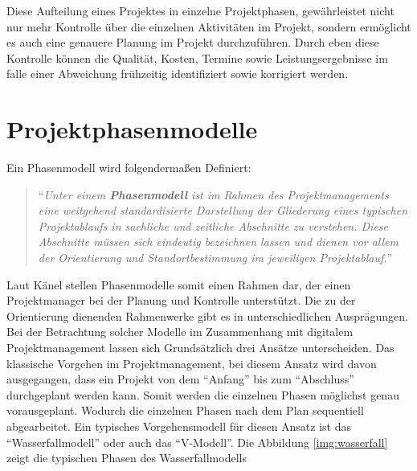 	Diese Aufteilung eines Projektes in einzelne Projektphasen, gewährleistet nicht nur mehr  Kontrolle über die einzelnen Aktivitäten im Projekt, sondern ermöglicht es auch eine genauere Planung im Projekt durchzuführen. Durch eben diese Kontrolle können die Qualität, Kosten, Termine sowie Leistungsergebnisse im falle einer Abweichung frühzeitig identifiziert sowie korrigiert werden.\cite[57]{Känel_2020_Projektphasen}
	
	
\section{Projektphasenmodelle}
\label{sec:phasenmodell}

	Ein Phasenmodell wird folgendermaßen Definiert:
	
	\begin{quote}
		\enquote{\textit{Unter einem \textbf{Phasenmodell} ist im Rahmen des Projektmanagements eine weitgehend
		standardisierte Darstellung der Gliederung eines typischen Projektablaufs
		in sachliche und zeitliche Abschnitte zu verstehen.
		Diese Abschnitte müssen sich eindeutig bezeichnen lassen und dienen vor allem
		der Orientierung und Standortbestimmung im jeweiligen Projektablauf.}}\autocite[57]{Känel_2020_Projektphasen}
	\end{quote}
	
	Laut Känel stellen Phasenmodelle somit einen Rahmen dar, der einen Projektmanager bei der Planung und Kontrolle unterstützt. Die zu der Orientierung dienenden Rahmenwerke gibt es in unterschiedlichen Ausprägungen. Bei der Betrachtung solcher Modelle im Zusammenhang mit digitalem Projektmanagement lassen sich Grundsätzlich drei Ansätze unterscheiden. Das klassische Vorgehen im Projektmanagement, bei diesem Ansatz wird davon ausgegangen, dass ein Projekt von dem \enquote{Anfang} bis zum \enquote{Abschluss} durchgeplant werden kann. Somit werden die einzelnen Phasen möglichst genau vorausgeplant. Wodurch die einzelnen Phasen nach dem Plan sequentiell abgearbeitet. Ein typisches Vorgehensmodell für diesen Ansatz ist das \enquote{Wasserfallmodell} oder auch das \enquote{V-Modell}\autocite[Kap. 2]{Vivenzio2013}. Die Abbildung \ref{img:wasserfall} zeigt die typischen Phasen des Wasserfallmodells 

